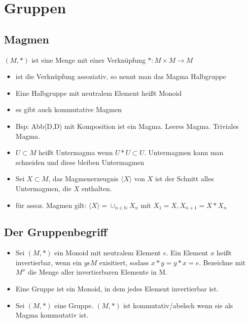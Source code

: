 \section{Gruppen}

\subsection{Magmen}

 $(M,*)$ ist eine Menge mit einer Verknüpfung $*:M\times M \to M$
\begin{itemize}
    \item ist die Verknüpfung assoziativ, so nennt man das Magma Halbgruppe
    \item Eine Halbgruppe mit neutralem Element heißt Monoid
    \item es gibt auch kommutative Magmen
    \item Bsp: Abb(D,D) mit Komposition ist ein Magma. Leeres Magma. Triviales Magma.
    \item $U\subset M$ heißt Untermagma wenn $U*U\subset U$. Untermagmen kann man schneiden und diese bleiben Untermagmen
    \item Sei $X\subset M$, das Magmenerzeugnis $\langle X\rangle$ von $X$ ist der Schnitt alles Untermagmen, die $X$ enthalten.
    \item für assoz. Magmen gilt: $\langle X\rangle = \cup_{n\in\mathbb{N}}X_n$ mit $X_1=X, X_{n+1}=X*X_n$ 
\end{itemize}

\subsection{Der Gruppenbegriff}

\begin{itemize}
    \item Sei $(M,*)$ ein Monoid mit neutralem Element $e$. Ein Element $x$ heißt invertierbar, wenn ein $y \epsilon M$ exisitiert, sodass $x*y=y*x=e$. Bezeichne mit $M^x$ die Menge aller invertierbaren Elemente in M.
    \item Eine Gruppe ist ein Monoid, in dem jedes Element invertierbar ist.
    \item Sei $(M,*)$ eine Gruppe. $(M,*)$ ist kommutativ/abelsch wenn sie als Magma kommutativ ist.
\end{itemize}

